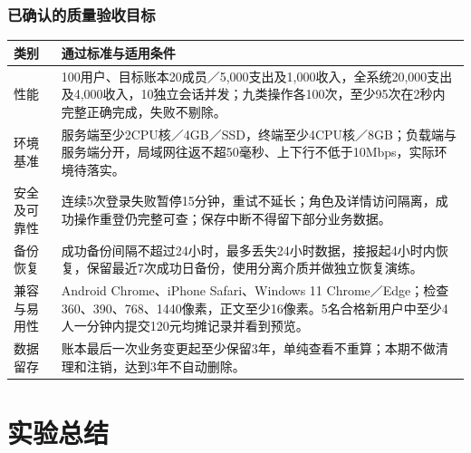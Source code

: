 \documentclass[UTF8,a4paper,11pt,fontset=fandol]{ctexart}
\renewcommand{\arraystretch}{1.3}
\newcommand{\smalltable}{\small\setlength{\tabcolsep}{5pt}\renewcommand{\arraystretch}{1.25}}
\begin{document}
\subsubsection{已确认的质量验收目标}
\begin{center}\smalltable
\begin{tabularx}{\linewidth}{p{22mm}Y}
\toprule
{}类别 & 通过标准与适用条件\\
\midrule
性能 & 100用户、目标账本20成员／5,000支出及1,000收入，全系统20,000支出及4,000收入，10独立会话并发；九类操作各100次，至少95次在2秒内完整正确完成，失败不剔除。\\
环境基准 & 服务端至少2CPU核／4GB／SSD，终端至少4CPU核／8GB；负载端与服务端分开，局域网往返不超50毫秒、上下行不低于10Mbps，实际环境待落实。\\
安全及可靠性 & 连续5次登录失败暂停15分钟，重试不延长；角色及详情访问隔离，成功操作重登仍完整可查；保存中断不得留下部分业务数据。\\
备份恢复 & 成功备份间隔不超过24小时，最多丢失24小时数据，接报起4小时内恢复，保留最近7次成功日备份，使用分离介质并做独立恢复演练。\\
兼容与易用性 & Android Chrome、iPhone Safari、Windows 11 Chrome／Edge；检查360、390、768、1440像素，正文至少16像素。5名合格新用户中至少4人一分钟内提交120元均摊记录并看到预览。\\
数据留存 & 账本最后一次业务变更起至少保留3年，单纯查看不重算；本期不做清理和注销，达到3年不自动删除。\\
\bottomrule
\end{tabularx}
\end{center}

\newpage
\section{实验总结}
\end{document}
